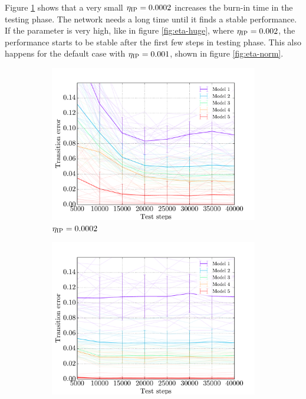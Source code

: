 Figure \ref{fig:eta-small} shows that a very small $\eta_{\text{IP}} = 0.0002$ increases the burn-in time in the testing phase. The network needs a long time until it finds a stable performance. If the parameter is very high, like in figure \ref{fig:eta-huge}, where $\eta_{\text{IP}} = 0.002$, the performance starts to be stable after the first few steps in testing phase. This also happens for the default case with $\eta_{\text{IP}} = 0.001$, shown in figure \ref{fig:eta-norm}.

\begin{figure}[!b]
    \centering
    \begin{subfigure}{0.48\textwidth}
    	\centering
        \includegraphics[width=\textwidth]{appendix/etaip_test_traces_distances_smallhip}
        \caption{$\eta_{\text{IP}} = 0.0002$}
        \label{fig:eta-small}
    \end{subfigure}
    \hfill
    \begin{subfigure}{0.48\textwidth}
    	\centering
        \includegraphics[width=\textwidth]{appendix/etaip_test_traces_distances_hugehip}

\end{subfigure}
\end{figure}

